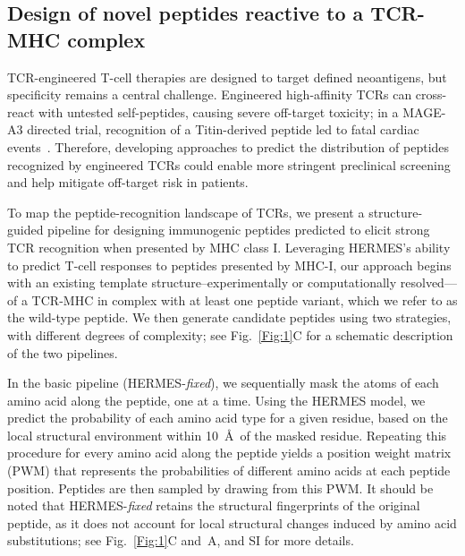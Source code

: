 \subsection{\bf Design of novel peptides reactive to a TCR-MHC complex} 
TCR-engineered T-cell therapies are designed to target defined neoantigens, but specificity
remains a central challenge. Engineered high-affinity TCRs can cross-react with untested
self-peptides, causing severe off-target toxicity; in a MAGE-A3 directed trial, recognition of a
Titin-derived peptide led to fatal cardiac events~\cite{Linette2013-tc}. Therefore, developing
approaches to predict the distribution of peptides recognized by engineered TCRs could enable more
stringent preclinical screening and help mitigate off-target risk in patients.


To map the peptide-recognition landscape of TCRs, we present a structure-guided pipeline for
designing immunogenic peptides predicted to elicit strong TCR recognition when presented by MHC
class I. Leveraging HERMES's ability to predict T-cell responses to peptides presented by MHC-I, our
approach begins with an existing template structure--experimentally or computationally resolved---of
a TCR-MHC in complex with at least one peptide variant, which we refer to as the wild-type peptide.
We then generate candidate peptides using two strategies, with different degrees of complexity; see
Fig.~\ref{Fig:1}C for a schematic description of the two pipelines.

In the basic pipeline (HERMES-{\em fixed}), we sequentially mask the atoms of each amino acid along
the peptide, one at a time.
Using the HERMES model, we predict the probability of each amino acid type for a given residue,
based on the local structural environment within 10~\AA\, of the masked residue. Repeating this
procedure for every amino acid along the peptide yields a position weight matrix (PWM) that
represents the probabilities of different amino acids at each peptide position. Peptides are then
sampled by drawing from this PWM. It should be noted that HERMES-{\em fixed} retains the structural
fingerprints of the original peptide, as it does not account for local structural changes induced by
amino acid substitutions; see Fig.~\ref{Fig:1}C and~\HermesDesignsEnergiesFigure A, and SI for more
details.

